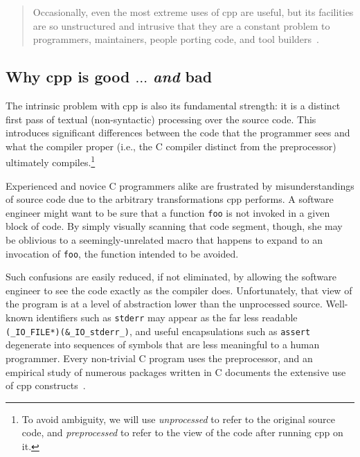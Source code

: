\documentclass{article}
\newcommand{\Cpp}{\mbox{\textsf{cpp}}}
\newcommand{\C}{\mbox{C}}
\newcommand{\ie}{i.e.,}
\begin{document}
\begin{quotation}
\noindent Occasionally, even the most extreme uses of \Cpp{} are useful, but its
facilities are so unstructured and intrusive that they are a constant
problem to programmers, maintainers, people porting code, and tool
builders~\cite[p.~424]{Stroustrup94}.
\end{quotation}

\subsection{Why \Cpp{} is good $\ldots$ \emph{and} bad}

The intrinsic problem with \Cpp{} is also its fundamental strength: it
is a distinct first pass of textual (non-syntactic) processing over the
source code.  This introduces significant differences between the code
that the programmer sees and what the compiler proper (\ie{} the \C{}
compiler distinct from the preprocessor) ultimately
compiles.\footnote{To avoid ambiguity, we will use \emph{unprocessed} to
  refer to the original source code, and \emph{preprocessed} to refer to
  the view of the code after running \Cpp{} on it.}

Experienced and novice \C{} programmers alike are frustrated by
misunderstandings of source code due to the arbitrary transformations
\Cpp{} performs. A software engineer might want to be sure that a
function \texttt{foo} is not invoked in a given block of code.  By
simply visually scanning that code segment, though, she may be oblivious 
to a seemingly-unrelated macro that happens to expand to an invocation
of \texttt{foo}, the function intended to be avoided.

Such confusions are easily reduced, if not eliminated,
by allowing the software engineer to see the code exactly as the
compiler does.  Unfortunately, that view of the program is at a level of
abstraction lower than the unprocessed source.  Well-known
identifiers such as \texttt{stderr} may appear as the far less readable
\texttt{(\_IO\_FILE*)(\&\_IO\_stderr\_)},
and useful encapsulations such as \texttt{assert} degenerate into
sequences of symbols that are less meaningful to a human programmer.  Every
non-trivial \C{} program uses the preprocessor, and an empirical study
of numerous packages written in \C{} documents the extensive use of \Cpp{}
constructs~\cite{EmpCpp-TR}.
\end{document}
